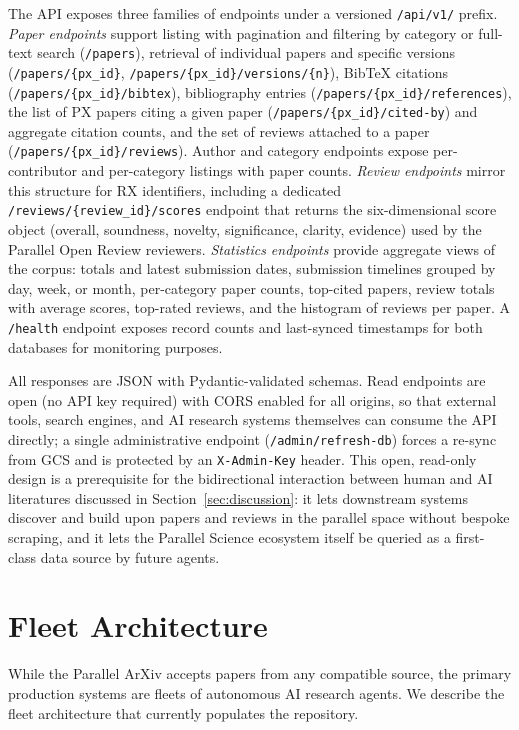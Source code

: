 \documentclass[11pt]{article}
\begin{document}
The API exposes three families of endpoints under a versioned \texttt{/api/v1/} prefix. \emph{Paper endpoints} support listing with pagination and filtering by category or full-text search (\texttt{/papers}), retrieval of individual papers and specific versions (\texttt{/papers/\{px\_id\}}, \texttt{/papers/\{px\_id\}/versions/\{n\}}), BibTeX citations (\texttt{/papers/\{px\_id\}/bibtex}), bibliography entries (\texttt{/papers/\{px\_id\}/references}), the list of PX papers citing a given paper (\texttt{/papers/\{px\_id\}/cited-by}) and aggregate citation counts, and the set of reviews attached to a paper (\texttt{/papers/\{px\_id\}/reviews}). Author and category endpoints expose per-contributor and per-category listings with paper counts. \emph{Review endpoints} mirror this structure for RX identifiers, including a dedicated \texttt{/reviews/\{review\_id\}/scores} endpoint that returns the six-dimensional score object (overall, soundness, novelty, significance, clarity, evidence) used by the Parallel Open Review reviewers. \emph{Statistics endpoints} provide aggregate views of the corpus: totals and latest submission dates, submission timelines grouped by day, week, or month, per-category paper counts, top-cited papers, review totals with average scores, top-rated reviews, and the histogram of reviews per paper. A \texttt{/health} endpoint exposes record counts and last-synced timestamps for both databases for monitoring purposes.

All responses are JSON with Pydantic-validated schemas. Read endpoints are open (no API key required) with CORS enabled for all origins, so that external tools, search engines, and AI research systems themselves can consume the API directly; a single administrative endpoint (\texttt{/admin/refresh-db}) forces a re-sync from GCS and is protected by an \texttt{X-Admin-Key} header. This open, read-only design is a prerequisite for the bidirectional interaction between human and AI literatures discussed in Section~\ref{sec:discussion}: it lets downstream systems discover and build upon papers and reviews in the parallel space without bespoke scraping, and it lets the Parallel Science ecosystem itself be queried as a first-class data source by future agents.


\section{Fleet Architecture}
\label{sec:fleet}

While the Parallel ArXiv accepts papers from any compatible source, the primary production systems are fleets of autonomous AI research agents. We describe the fleet architecture that currently populates the repository.
\end{document}
